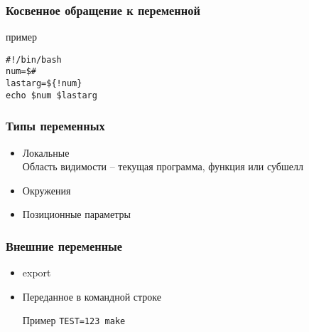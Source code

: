 \begin{frame}[fragile]
  \frametitle{Косвенное обращение к переменной}
	\begin{block}{пример}
		\begin{lstlisting}
#!/bin/bash 
num=$# 
lastarg=${!num} 
echo $num $lastarg
		\end{lstlisting}
	\end{block}
\end{frame}

\begin{frame}
	\frametitle{Типы переменных}
	\begin{itemize}
		\item Локальные\\
		    Область видимости -- текущая программа, функция или субшелл
		\item Окружения
		\item Позиционные параметры
	\end{itemize}
\end{frame}



\begin{frame}
	\frametitle{Внешние переменные}


	\begin{itemize}
		\item export
		\item Переданное в командной строке \\
			\begin{block}{Пример}
				{\tt TEST=123 make}
			\end{block}
	\end{itemize}
\end{frame}


